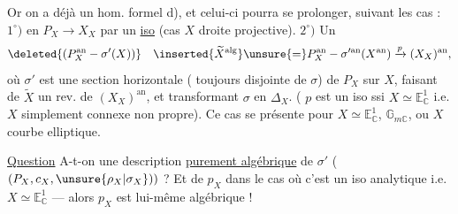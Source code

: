 Or on a déjà un hom. formel d), et celui-ci pourra se prolonger, suivant les cas : $1^\circ)$ en $P_X\longrightarrow X_X$ par un \uline{iso} (cas $X$ droite projective). $2^\circ)$ Un 
\[
\deleted{(P_X^{\mathrm{an}}-\sigma'(X))}\quad
\inserted{\widetilde X^{\mathrm{alg}}}\unsure{=}
P_X^{\mathrm{an}}-\sigma'^{\mathrm{an}}(X^{\mathrm{an}})\xrightarrow{p}(X_X)^{\mathrm{an}},
\]
où $\sigma'$ est une section horizontale ( toujours disjointe de $\sigma$) de $P_X$ sur $X$, faisant de $\widetilde X$ un rev. de $(X_X)^{\mathrm{an}}$, et transformant $\sigma$ en $\Delta_X$. ( $p$ est un iso ssi $X\simeq \mathbb E^1_{\mathbb C}$ i.e. $X$ simplement connexe non propre). Ce cas se présente pour $X\simeq \mathbb E^1_{\mathbb C}$, $\mathbb G_{m\mathbb C}$, ou $X$ courbe elliptique.


\uline{Question} A-t-on une description \uline{purement algébrique} de $\sigma'$ ( $(P_X,c_X,\unsure{\rho_X|\sigma_X}))$ ? Et de $p_X$ dans le cas où c'est un iso analytique i.e. $X\simeq \mathbb E^1_{\mathbb C}$ --- alors $p_X$ est lui-même algébrique !


